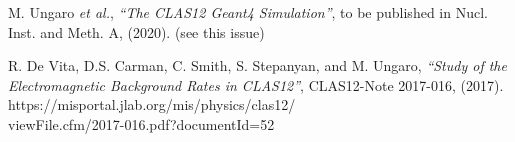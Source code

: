 \documentclass[3p,times,twocolumn]{elsarticle}
\begin{document}
\begin{thebibliography}{99}
M. Ungaro {\it et al.}, {\it ``The CLAS12 Geant4 Simulation''}, to be published in Nucl. Inst.
and Meth. A, (2020). (see this issue)

R. De Vita, D.S. Carman, C. Smith, S. Stepanyan, and M. Ungaro, {\it ``Study of the Electromagnetic Background
Rates in CLAS12''}, CLAS12-Note 2017-016, (2017).\\
https://misportal.jlab.org/mis/physics/clas12/\\ viewFile.cfm/2017-016.pdf?documentId=52

\end{thebibliography}
\end{document}
